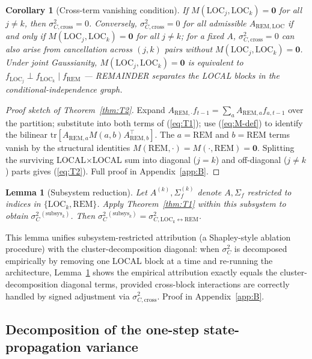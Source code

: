 \documentclass[11pt,letterpaper]{article}
\newtheorem{corollary}{Corollary}
\newtheorem{lemma}{Lemma}
\theoremstyle{remark}
\newcommand{\REM}{\mathrm{REM}}
\newcommand{\LOC}{\mathrm{LOC}}
\newcommand{\trace}{\mathrm{tr}}
\begin{document}
\begin{corollary}[Cross-term vanishing condition]\label{cor:cond-indep}
If $M(\LOC_j, \LOC_k) = \mathbf{0}$ for all $j \ne k$, then $\sigma^2_{C, \mathrm{cross}} = 0$. Conversely, $\sigma^2_{C, \mathrm{cross}} = 0$ for all admissible $A_{\REM, \LOC}$ if and only if $M(\LOC_j, \LOC_k) = \mathbf{0}$ for all $j \ne k$; for a fixed $A$, $\sigma^2_{C, \mathrm{cross}} = 0$ can also arise from cancellation across $(j, k)$ pairs without $M(\LOC_j, \LOC_k) = \mathbf{0}$. Under joint Gaussianity, $M(\LOC_j, \LOC_k) = \mathbf{0}$ is equivalent to $f_{\LOC_j} \perp f_{\LOC_k} \mid f_\REM$ --- REMAINDER separates the LOCAL blocks in the conditional-independence graph.
\end{corollary}

\begin{proof}[Proof sketch of Theorem~\ref{thm:T2}]
Expand $A_{\REM, \cdot} f_{t-1} = \sum_a A_{\REM, a} f_{a, t-1}$ over the partition; substitute into both terms of (\ref{eq:T1}); use (\ref{eq:M-def}) to identify the bilinear $\trace[A_{\REM, a} M(a, b) A_{\REM, b}^\top]$. The $a = \REM$ and $b = \REM$ terms vanish by the structural identities $M(\REM, \cdot) = M(\cdot, \REM) = \mathbf{0}$. Splitting the surviving LOCAL$\times$LOCAL sum into diagonal ($j = k$) and off-diagonal ($j \ne k$) parts gives (\ref{eq:T2}). Full proof in Appendix~\ref{app:B}.
\end{proof}

\begin{lemma}[Subsystem reduction]\label{lem:subsys}
Let $A^{(k)}, \Sigma_f^{(k)}$ denote $A, \Sigma_f$ restricted to indices in $\{\LOC_k, \REM\}$. Apply Theorem~\ref{thm:T1} within this subsystem to obtain $\sigma^2_{C}{}^{(\mathrm{subsys}_k)}$. Then $\sigma^2_{C}{}^{(\mathrm{subsys}_k)} = \sigma^2_{C, \LOC_k \leftrightarrow \REM}$.
\end{lemma}

This lemma unifies subsystem-restricted attribution (a Shapley-style ablation procedure) with the cluster-decomposition diagonal: when $\sigma^2_C$ is decomposed empirically by removing one LOCAL block at a time and re-running the architecture, Lemma~\ref{lem:subsys} shows the empirical attribution exactly equals the cluster-decomposition diagonal terms, provided cross-block interactions are correctly handled by signed adjustment via $\sigma^2_{C, \mathrm{cross}}$. Proof in Appendix~\ref{app:B}.

\subsection{Decomposition of the one-step state-propagation variance}\label{sec:cor-init}
\end{document}
